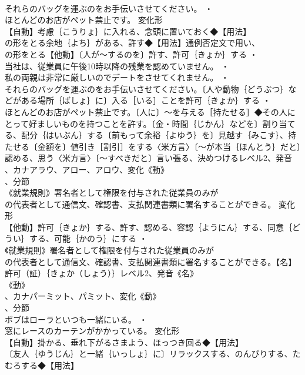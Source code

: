 \documentclass[8pt]{extreport}
\begin{document}
\begin{CJK}{UTF8}{min}
\\	それらのバッグを運ぶのをお手伝いさせてください。 ・
\\	ほとんどのお店がペット禁止です。	変化形 
\\	【自動】考慮｛こうりょ｝に入れる、念頭に置いておく◆【用法】
\\	の形をとる余地｛よち｝がある、許す◆【用法】通例否定文で用い、
\\	の形をとる【他動】〔人が～するのを〕許す、許可｛きょか｝する ・
\\	当社は、従業員に午後10時以降の残業を認めていません。 ・
\\	私の両親は非常に厳しいのでデートをさせてくれません。 ・
\\	それらのバッグを運ぶのをお手伝いさせてください。〔人や動物｛どうぶつ｝などがある場所｛ばしょ｝に〕入る［いる］ことを許可｛きょか｝する ・
\\	ほとんどのお店がペット禁止です。〔人に〕～を与える［持たせる］◆その人にとって好ましいものを持つことを許す。〔金・時間｛じかん｝などを〕割り当てる、配分｛はいぶん｝する〔前もって余裕｛よゆう｝を〕見越す｛みこす｝、持たせる〔金額を〕値引き［割引］をする〈米方言〉〔～が本当｛ほんとう｝だと〕認める、思う〈米方言〉〔～すべきだと〕言い張る、決めつけるレベル2、発音
\\	、カナアラウ、アロー、アロウ、変化《動》
\\	、分節
\\	《就業規則》署名者として権限を付与された従業員のみが
\\	の代表者として通信文、確認書、支払関連書類に署名することができる。	変化形 
\\	【他動】許可｛きょか｝する、許す、認める、容認｛ようにん｝する、同意｛どうい｝する、可能｛かのう｝にする ・
\\	《就業規則》署名者として権限を付与された従業員のみが
\\	の代表者として通信文、確認書、支払関連書類に署名することができる。【名】許可（証）｛きょか（しょう）｝レベル2、発音《名》
\\	《動》
\\	、カナパーミット、パミット、変化《動》
\\	、分節
\\	ボブはローラといつも一緒にいる。 ・
\\	窓にレースのカーテンがかかっている。	変化形 
\\	【自動】掛かる、垂れ下がるさまよう、ほっつき回る◆【用法】
\\	〔友人｛ゆうじん｝と一緒｛いっしょ｝に〕リラックスする、のんびりする、たむろする◆【用法】

\end{CJK}
\end{document}
